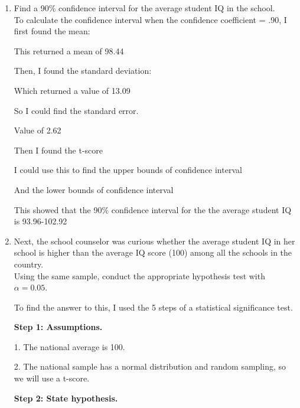 \documentclass[12pt,letterpaper]{article}
\begin{document}
\begin{enumerate}
	\item Find a 90\% confidence interval for the average student IQ in the school.\\
	
		To calculate the confidence interval when the confidence coefficient = .90, I first found the mean:
		
		  
		
		This returned a mean of 98.44
		
		Then, I found the standard deviation:
		
		
		Which returned a value of 13.09
		
		So I could find the standard error.
		 
		Value of 2.62 
		
		Then I found the t-score
 		  
		
		I could use this to find the upper bounds of confidence interval
		  
		
		And the lower bounds of confidence interval
		 
		 
		This showed that the 90\% confidence interval for the the average student IQ is 
		93.96-102.92
	
	\item Next, the school counselor was curious  whether  the average student IQ in her school is higher than the average IQ score (100) among all the schools in the country.\\ 
	
	\noindent Using the same sample, conduct the appropriate hypothesis test with $\alpha=0.05$.
	
		To find the answer to this, I used the 5 steps of a statistical significance test.
		
		\textbf{Step 1: Assumptions.}
		
		1. The national average is 100.
		 
		2. The national sample has a normal distribution and random sampling, so we will use a t-score.
		
		\textbf{Step 2: State hypothesis.}
		

\end{enumerate}
\end{document}
